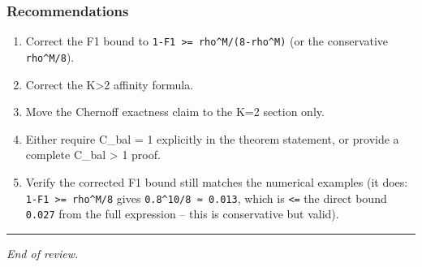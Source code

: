 \documentclass[
  12pt,
]{ctexart}
\providecommand{\tightlist}{%
  \setlength{\itemsep}{0pt}\setlength{\parskip}{0pt}}
\begin{document}
\subsubsection{Recommendations}\label{recommendations}

\begin{enumerate}
\def\labelenumi{\arabic{enumi}.}
\tightlist
\item
  Correct the F1 bound to
  \texttt{1-F1\ \textgreater{}=\ rho\^{}M/(8-rho\^{}M)} (or the
  conservative \texttt{rho\^{}M/8}).
\item
  Correct the K\textgreater2 affinity formula.
\item
  Move the Chernoff exactness claim to the K=2 section only.
\item
  Either require C\_bal = 1 explicitly in the theorem statement, or
  provide a complete C\_bal \textgreater{} 1 proof.
\item
  Verify the corrected F1 bound still matches the numerical examples (it
  does: \texttt{1-F1\ \textgreater{}=\ rho\^{}M/8} gives
  \texttt{0.8\^{}10/8\ ≈\ 0.013}, which is \texttt{\textless{}=} the
  direct bound \texttt{0.027} from the full expression -- this is
  conservative but valid).
\end{enumerate}

\begin{center}\rule{0.5\linewidth}{0.5pt}\end{center}

\emph{End of review.}
\end{document}
